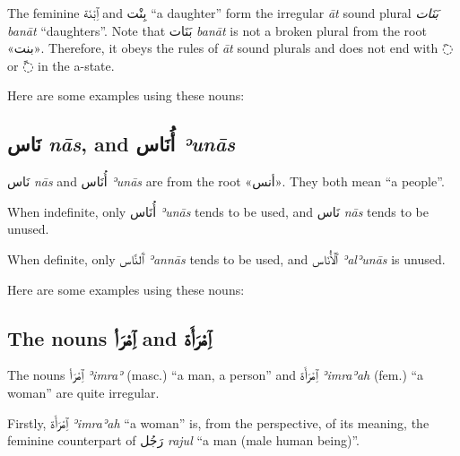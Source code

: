 \documentclass[
  10pt,
]{book}
\begin{document}
The feminine
\foreignlanguage{arabic}{ٱِبْنَة}
and
\foreignlanguage{arabic}{بِنْت}
\enquote{a daughter}
form the irregular \emph{āt} sound plural
\emph{بَنَات} \emph{banāt} \enquote{daughters}.
Note that
\foreignlanguage{arabic}{بَنَات} \emph{banāt}
is not a broken plural from the root \foreignlanguage{arabic}{«بنت»}. Therefore, it obeys the rules of \emph{āt} sound plurals and does not end with \foreignlanguage{arabic}{◌َ} or \foreignlanguage{arabic}{◌ً} in the a-state.

Here are some examples using these nouns:

\subsection{\texorpdfstring{\foreignlanguage{arabic}{نَاس} \emph{nās}, and \foreignlanguage{arabic}{أُنَاس} \emph{ʾunās}}{نَاس nās, and أُنَاس ʾunās}}\label{ux646ux627ux633-nas-and-ux623ux646ux627ux633-eunas}

\foreignlanguage{arabic}{نَاس} \emph{nās}
and
\foreignlanguage{arabic}{أُنَاس} \emph{ʾunās}
are from the root \foreignlanguage{arabic}{«أنس»}.
They both mean \enquote{a people}.

When indefinite, only
\foreignlanguage{arabic}{أُنَاس} \emph{ʾunās}
tends to be used, and
\foreignlanguage{arabic}{نَاس} \emph{nās}
tends to be unused.

When definite, only
\foreignlanguage{arabic}{ٱَلنَّاس} \emph{ʾannās}
tends to be used, and
\foreignlanguage{arabic}{ٱَلْأُنَاس} \emph{ʾalʾunās}
is unused.

Here are some examples using these nouns:

\subsection{\texorpdfstring{The nouns \foreignlanguage{arabic}{ٱِمْرَأ} and \foreignlanguage{arabic}{ٱِمْرَأَة}}{The nouns ٱِمْرَأ and ٱِمْرَأَة}}\label{the-nouns-ux671ux645ux631ux623-and-ux671ux645ux631ux623ux629}

The nouns
\foreignlanguage{arabic}{ٱِمْرَأ} \emph{ʾimraʾ} (masc.) \enquote{a man, a person} and
\foreignlanguage{arabic}{ٱِمْرَأَة} \emph{ʾimraʾah} (fem.) \enquote{a woman}
are quite irregular.

Firstly,
\foreignlanguage{arabic}{ٱِمْرَأَة} \emph{ʾimraʾah} \enquote{a woman}
is, from the perspective, of its meaning, the feminine counterpart of
\foreignlanguage{arabic}{رَجُل} \emph{rajul} \enquote{a man (male human being)}.
\end{document}
